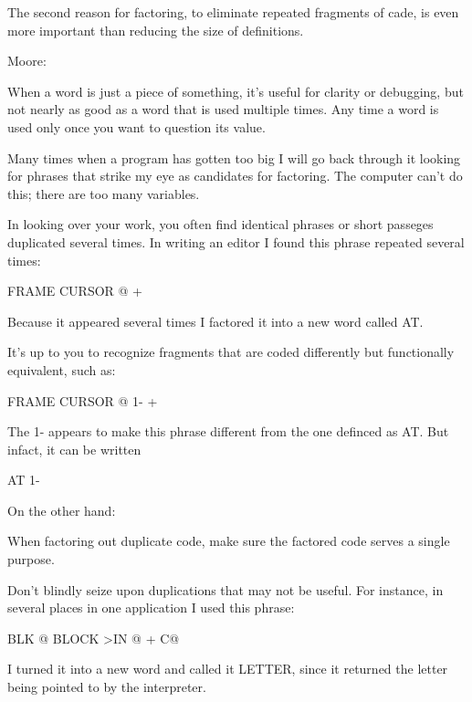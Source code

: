 \begin{tip}
The second reason for factoring, to eliminate repeated fragments of cade, is even more important than reducing the size of definitions.
\end{tip}

\bigskip
\blackline{2ex}
\noindent Moore:

\begin{tfquot}
When a word is just a piece of something, it's useful for clarity or debugging, but not nearly as good as a word that is used multiple times. Any time a word is used only once you want to question its value.

Many times when a program has gotten too big I will go back through it looking for phrases that strike my eye as candidates for factoring. The computer can't do this; there are too many variables.
\end{tfquot}
\blackline{1ex}
In looking over your work, you often find identical phrases or short passeges duplicated several times. In writing an editor I found this phrase repeated several times:

\begin{Code}
FRAME  CURSOR @ +
\end{Code}
Because it appeared several times I factored it into a new word called AT.

It's up to you to recognize fragments that are coded differently but functionally equivalent, such as:

\begin{Code}
FRAME  CURSOR @ 1-  +
\end{Code}
The 1- appears to make this phrase different from the one definced as AT. But infact, it can be written

\begin{Code}
AT 1-
\end{Code}
On the other hand:

\begin{tip}
When factoring out duplicate code, make sure the factored code serves a single purpose.
\end{tip}
Don't blindly seize upon duplications that may not be useful. For instance, in several places in one application I used this phrase:

\begin{Code}
BLK @ BLOCK  >IN @ +  C@
\end{Code}
I turned it into a new word and called it LETTER, since it returned the letter being pointed to by the interpreter.

